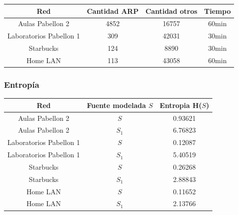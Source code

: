 \begin{table}[h]
\centering
\begin{tabular}{@{}cccc@{}}
\toprule
Red                     & Cantidad ARP & Cantidad otros & Tiempo \\ \midrule
Aulas Pabellon 2        & 4852         & 16757          & 60min      \\
Laboratorios Pabellon 1 & 309          & 42031          & 30min  \\
Starbucks               & 124          & 8890           & 30min  \\
Home LAN                & 113          & 43058          & 60min      \\ \bottomrule
\end{tabular}
\end{table}

\subsubsection{Entropía}
\begin{table}[h]
\centering
\begin{tabular}{@{}ccc@{}}
\toprule
Red                     & Fuente modelada $S$ & Entropia H($S$) \\ \midrule
Aulas Pabellon 2        & $S$              & 0.93621       \\
Aulas Pabellon 2        & $S_{1}$              & 6.76823       \\ \midrule
Laboratorios Pabellon 1 & $S$              & 0.12087       \\
Laboratorios Pabellon 1 & $S_{1}$              & 5.40519       \\ \midrule
Starbucks               & $S$              & 0.26268       \\
Starbucks               & $S_{1}$              & 2.88843       \\ \midrule
Home LAN                & $S$              & 0.11652       \\
Home LAN                & $S_{1}$              & 2.13766       \\ \bottomrule
\end{tabular}
\end{table}

\newpage
